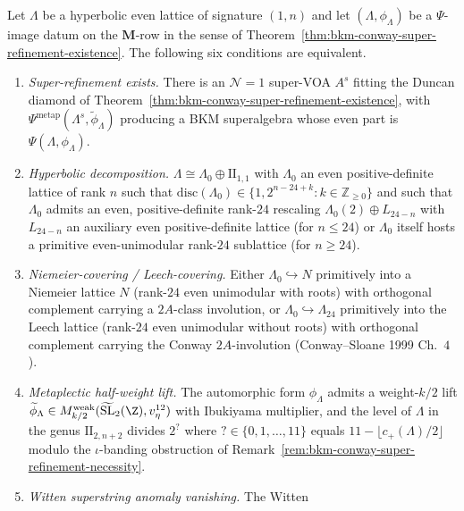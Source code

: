 \begin{theorem}
\label{thm:bkm-super-refinement-lattice-criterion}
Let $\Lambda$ be a hyperbolic even lattice of signature $(1, n)$ and
let $(\Lambda, \phi_\Lambda)$ be a $\Psi$-image datum on the
$\mathbf{M}$-row in the sense of
Theorem~\ref{thm:bkm-conway-super-refinement-existence}.
The following six conditions are equivalent.
\begin{enumerate}[label=\textup{(C\arabic*)}]
\item \emph{Super-refinement exists.} There is an
$\mathcal{N}{=}1$ super-VOA $A^{s}$ fitting the Duncan diamond of
Theorem~\ref{thm:bkm-conway-super-refinement-existence}, with
$\Psi^{\mathrm{metap}}(\Lambda^{s}, \widetilde\phi_\Lambda)$
producing a BKM superalgebra whose even part is
$\Psi(\Lambda, \phi_\Lambda)$.
\item \emph{Hyperbolic decomposition.}
$\Lambda \cong \Lambda_0 \oplus \mathrm{II}_{1,1}$ with
$\Lambda_0$ an even positive-definite lattice of rank $n$ such that
$\mathrm{disc}(\Lambda_0) \in \{1, 2^{n-24+k}: k\in\mathbb{Z}_{\geq 0}\}$
and such that $\Lambda_0$ admits an even, positive-definite rank-$24$
rescaling $\Lambda_0(2)\oplus L_{24-n}$ with $L_{24-n}$ an
auxiliary even positive-definite lattice (for $n \leq 24$) or
$\Lambda_0$ itself hosts a primitive even-unimodular rank-$24$
sublattice (for $n \geq 24$).
\item \emph{Niemeier-covering / Leech-covering.} Either
$\Lambda_0\hookrightarrow N$ primitively into a Niemeier lattice $N$
(rank-$24$ even unimodular with roots) with orthogonal complement
carrying a $2A$-class involution, or
$\Lambda_0\hookrightarrow \Lambda_{24}$ primitively into the Leech
lattice (rank-$24$ even unimodular without roots) with orthogonal
complement carrying the Conway $2A$-involution
(Conway--Sloane 1999 Ch.~$4$).
\item \emph{Metaplectic half-weight lift.} The automorphic form
$\phi_\Lambda$ admits a weight-$k/2$ lift
$\widetilde\phi_\Lambda\in M^{\mathrm{weak}}_{k/2}(\widetilde{\mathrm{SL}}_2(\Z),
v_\eta^{12})$ with Ibukiyama multiplier, and the level of $\Lambda$
in the genus
$\mathrm{II}_{2, n+2}$ divides $2^{?}$ where $?\in\{0,1,\ldots,11\}$
equals $11 - \lfloor c_+(\Lambda) / 2\rfloor$ modulo the
$\iota$-banding obstruction of
Remark~\ref{rem:bkm-conway-super-refinement-necessity}.
\item \emph{Witten superstring anomaly vanishing.} The Witten

\end{enumerate}
\end{theorem}
